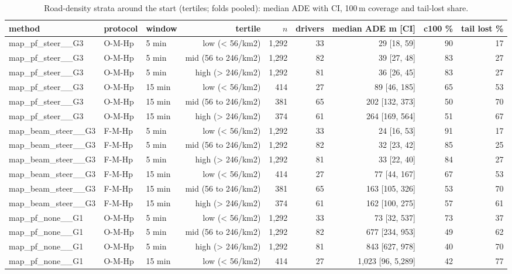 \begin{table}[t]\centering\scriptsize\setlength{\tabcolsep}{3pt}
\caption{Road-density strata around the start (tertiles; folds pooled): median ADE with CI, 100\,m coverage and tail-lost share.}\label{tab:supp_density}
\begin{tabular}{lllrrrrrr}\toprule
method & protocol & window & tertile & $n$ & drivers & median ADE m [CI] & c100 \% & tail lost \% \\\midrule
map\_pf\_steer\_\_G3 & O-M-Hp & 5 min & low (< 56/km2) & 1{,}292 & 33 & 29 [18, 59] & 90 & 17 \\
map\_pf\_steer\_\_G3 & O-M-Hp & 5 min & mid (56 to 246/km2) & 1{,}292 & 82 & 39 [27, 48] & 83 & 27 \\
map\_pf\_steer\_\_G3 & O-M-Hp & 5 min & high (> 246/km2) & 1{,}292 & 81 & 36 [26, 45] & 83 & 27 \\
map\_pf\_steer\_\_G3 & O-M-Hp & 15 min & low (< 56/km2) & 414 & 27 & 89 [46, 185] & 65 & 53 \\
map\_pf\_steer\_\_G3 & O-M-Hp & 15 min & mid (56 to 246/km2) & 381 & 65 & 202 [132, 373] & 50 & 70 \\
map\_pf\_steer\_\_G3 & O-M-Hp & 15 min & high (> 246/km2) & 374 & 61 & 264 [169, 564] & 51 & 67 \\
map\_beam\_steer\_\_G3 & F-M-Hp & 5 min & low (< 56/km2) & 1{,}292 & 33 & 24 [16, 53] & 91 & 17 \\
map\_beam\_steer\_\_G3 & F-M-Hp & 5 min & mid (56 to 246/km2) & 1{,}292 & 82 & 32 [23, 42] & 85 & 25 \\
map\_beam\_steer\_\_G3 & F-M-Hp & 5 min & high (> 246/km2) & 1{,}292 & 81 & 33 [22, 40] & 84 & 27 \\
map\_beam\_steer\_\_G3 & F-M-Hp & 15 min & low (< 56/km2) & 414 & 27 & 77 [44, 167] & 67 & 53 \\
map\_beam\_steer\_\_G3 & F-M-Hp & 15 min & mid (56 to 246/km2) & 381 & 65 & 163 [105, 326] & 53 & 70 \\
map\_beam\_steer\_\_G3 & F-M-Hp & 15 min & high (> 246/km2) & 374 & 61 & 162 [100, 275] & 57 & 61 \\
map\_pf\_none\_\_G1 & O-M-Hp & 5 min & low (< 56/km2) & 1{,}292 & 33 & 73 [32, 537] & 73 & 37 \\
map\_pf\_none\_\_G1 & O-M-Hp & 5 min & mid (56 to 246/km2) & 1{,}292 & 82 & 677 [234, 953] & 49 & 62 \\
map\_pf\_none\_\_G1 & O-M-Hp & 5 min & high (> 246/km2) & 1{,}292 & 81 & 843 [627, 978] & 40 & 70 \\
map\_pf\_none\_\_G1 & O-M-Hp & 15 min & low (< 56/km2) & 414 & 27 & 1{,}023 [96, 5{,}289] & 42 & 77 \\

\end{tabular}
\end{table}
